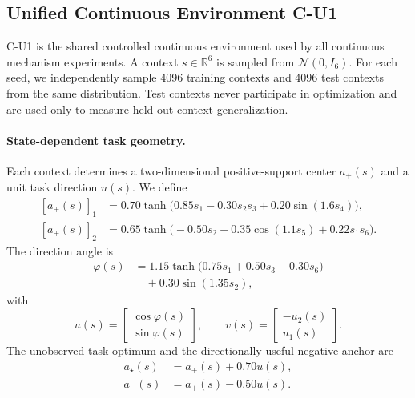 \documentclass{article}
\theoremstyle{plain}
\theoremstyle{definition}
\theoremstyle{remark}
\begin{document}
\subsection{Unified Continuous Environment C-U1}
\label{app:cu1_environment}

C-U1 is the shared controlled continuous environment used by all
continuous mechanism experiments. A context
$s\in\mathbb R^6$
is sampled from
$\mathcal N(0,I_6)$.
For each seed, we independently sample 4096 training contexts and 4096
test contexts from the same distribution. Test contexts never
participate in optimization and are used only to measure
held-out-context generalization.

\paragraph{State-dependent task geometry.}
Each context determines a two-dimensional positive-support center
$a_+(s)$ and a unit task direction $u(s)$. We define
\begin{equation}
\begin{aligned}
    [a_+(s)]_1
    &=
    0.70
    \tanh
    \bigl(
        0.85s_1
        -
        0.30s_2s_3
        +
        0.20\sin(1.6s_4)
    \bigr), \\
    [a_+(s)]_2
    &=
    0.65
    \tanh
    \bigl(
        -0.50s_2
        +
        0.35\cos(1.1s_5)
        +
        0.22s_1s_6
    \bigr).
\end{aligned}
\label{eq:cu1_positive_center}
\end{equation}
The direction angle is
\begin{equation}
\begin{aligned}
    \varphi(s)
    &=
    1.15
    \tanh
    \bigl(
        0.75s_1
        +
        0.50s_3
        -
        0.30s_6
    \bigr) \\
    &\quad+
    0.30\sin(1.35s_2),
\end{aligned}
\label{eq:cu1_direction_angle}
\end{equation}
with
\begin{equation}
    u(s)
    =
    \begin{bmatrix}
        \cos\varphi(s)\\
        \sin\varphi(s)
    \end{bmatrix},
    \qquad
    v(s)
    =
    \begin{bmatrix}
        -u_2(s)\\
        u_1(s)
    \end{bmatrix}.
    \label{eq:cu1_task_basis}
\end{equation}
The unobserved task optimum and the directionally useful negative anchor
are
\begin{equation}
\begin{aligned}
    a_\star(s)
    &=
    a_+(s)+0.70u(s), \\
    a_-(s)
    &=
    a_+(s)-0.50u(s).
\end{aligned}
\label{eq:cu1_task_points}
\end{equation}
\end{document}

